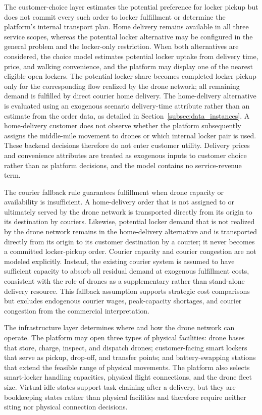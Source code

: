 \documentclass[final,3p,authoryear]{elsarticle}
\begin{document}
The customer-choice layer estimates the potential preference for locker pickup but does not commit every such order to locker fulfillment or determine the platform's internal transport plan.
Home delivery remains available in all three service scopes, whereas the potential locker alternative may be configured in the general problem and the locker-only restriction.
When both alternatives are considered, the choice model estimates potential locker uptake from delivery time, price, and walking convenience, and the platform may display one of the nearest eligible open lockers.
The potential locker share becomes completed locker pickup only for the corresponding flow realized by the drone network; all remaining demand is fulfilled by direct courier home delivery.
The home-delivery alternative is evaluated using an exogenous scenario delivery-time attribute rather than an estimate from the order data, as detailed in Section~\ref{subsec:data_instances}.
A home-delivery customer does not observe whether the platform subsequently assigns the middle-mile movement to drones or which internal locker pair is used.
These backend decisions therefore do not enter customer utility.
Delivery prices and convenience attributes are treated as exogenous inputs to customer choice rather than as platform decisions, and the model contains no service-revenue term.
\color{black}

\color{blue}
The courier fallback rule guarantees fulfillment when drone capacity or availability is insufficient.
A home-delivery order that is not assigned to or ultimately served by the drone network is transported directly from its origin to its destination by couriers.
Likewise, potential locker demand that is not realized by the drone network remains in the home-delivery alternative and is transported directly from its origin to its customer destination by a courier; it never becomes a committed locker-pickup order.
Courier capacity and courier congestion are not modeled explicitly.
Instead, the existing courier system is assumed to have sufficient capacity to absorb all residual demand at exogenous fulfillment costs, consistent with the role of drones as a supplementary rather than stand-alone delivery resource.
This fallback assumption supports strategic cost comparisons but excludes endogenous courier wages, peak-capacity shortages, and courier congestion from the commercial interpretation.
\color{black}

The infrastructure layer determines where and how the drone network can operate. The platform may open three types of physical facilities: drone bases that store, charge, inspect, and dispatch drones; customer-facing smart lockers that serve as pickup, drop-off, and transfer points; and battery-swapping stations that extend the feasible range of physical movements. The platform also selects smart-locker handling capacities, physical flight connections, and the drone fleet size. Virtual idle states support task chaining after a delivery, but they are bookkeeping states rather than physical facilities and therefore require neither siting nor physical connection decisions.
\end{document}
